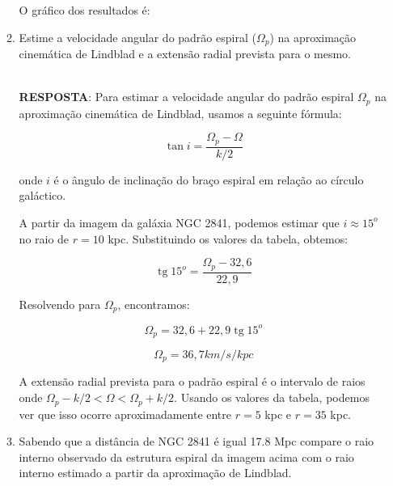 \documentclass[a4paper,12pt]{article}
\DeclareMathOperator{\tg}{tg}
\begin{document}
\begin{enumerate}
\begin{enumerate}
O gráfico dos resultados é:

\color[rgb]{0.5,0.5,0.5}


\color[rgb]{1,1,1}

\noindent\hrulefill

\item Estime a velocidade angular do padrão espiral ($\Omega_p$) na aproximação cinemática de Lindblad e a extensão radial prevista para o mesmo.

\noindent\hrulefill\\\textbf{RESPOSTA}: Para estimar a velocidade angular do padrão espiral $\Omega_p$ na aproximação cinemática de Lindblad, usamos a seguinte fórmula:

$$ \tan i = \frac{\Omega_p - \Omega}{k/2} $$

onde $i$ é o ângulo de inclinação do braço espiral em relação ao círculo galáctico.

A partir da imagem da galáxia NGC 2841, podemos estimar que $i \approx 15^o$ no raio de $r = 10$ kpc. Substituindo os valores da tabela, obtemos:

$$ \tg 15^o = \frac{\Omega_p -32,6}{22,9} $$

Resolvendo para $\Omega_p$, encontramos:

$$ \Omega_p = 32,6 + 22,9 \tg 15^o $$

$$ \Omega_p = 36,7 km/s/kpc $$

A extensão radial prevista para o padrão espiral é o intervalo de raios onde $\Omega_p - k/2 < \Omega < \Omega_p + k/2$. Usando os valores da tabela, podemos ver que isso ocorre aproximadamente entre $r = 5$ kpc e $r = 35$ kpc.

\noindent\hrulefill

\item Sabendo que a distância de NGC 2841 é igual 17.8 Mpc compare o raio interno observado da estrutura espiral da imagem acima com o raio interno estimado a partir da aproximação de Lindblad.


\end{enumerate}
\end{enumerate}
\end{document}
